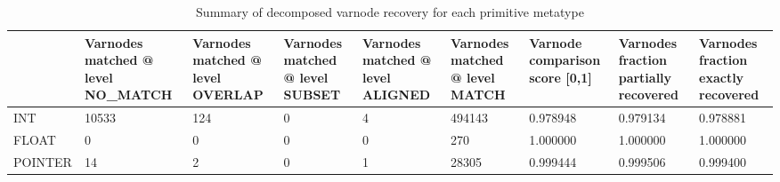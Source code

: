 \begin{table}[t]
\centering
\caption{Summary of decomposed varnode recovery for each primitive metatype}
\label{table:metatype-recovery-summary-with-levels-decomposed}
\begin{tabular}{lp{2.2cm}p{2.2cm}p{2.2cm}p{2.2cm}p{2.2cm}p{2.2cm}p{2.2cm}p{2.2cm}}
\toprule
{} &  Varnodes matched @ level NO\_MATCH &  Varnodes matched @ level OVERLAP &  Varnodes matched @ level SUBSET &  Varnodes matched @ level ALIGNED &  Varnodes matched @ level MATCH &  Varnode comparison score [0,1] &  Varnodes fraction partially recovered &  Varnodes fraction exactly recovered \\
\midrule
INT     &                              10533 &                               124 &                                0 &                                 4 &                          494143 &                        0.978948 &                               0.979134 &                             0.978881 \\
FLOAT   &                                  0 &                                 0 &                                0 &                                 0 &                             270 &                        1.000000 &                               1.000000 &                             1.000000 \\
POINTER &                                 14 &                                 2 &                                0 &                                 1 &                           28305 &                        0.999444 &                               0.999506 &                             0.999400 \\
\bottomrule
\end{tabular}
\end{table}
